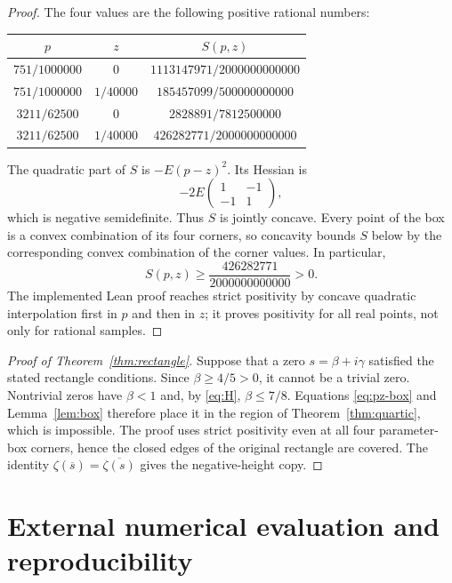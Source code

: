 \documentclass[11pt,a4paper]{article}
\theoremstyle{definition}
\begin{document}
\begin{proof}
The four values are the following positive rational numbers:
\begin{center}
\begin{tabular}{ccc}
\toprule
$p$ & $z$ & $S(p,z)$\\
\midrule
$751/1000000$ & $0$ & $1113147971/2000000000000$\\
$751/1000000$ & $1/40000$ & $185457099/500000000000$\\
$3211/62500$ & $0$ & $2828891/7812500000$\\
$3211/62500$ & $1/40000$ & $426282771/2000000000000$\\
\bottomrule
\end{tabular}
\end{center}
The quadratic part of $S$ is $-E(p-z)^2$. Its Hessian is
\[
 -2E\begin{pmatrix}1&-1\\-1&1\end{pmatrix},
\]
which is negative semidefinite. Thus $S$ is jointly concave.
Every point of the box is a convex combination of its four corners,
so concavity bounds $S$ below by the corresponding convex
combination of the corner values. In particular,
\begin{equation}\label{eq:margin}
 S(p,z)\ge\frac{426282771}{2000000000000}>0.
\end{equation}
The implemented Lean proof reaches strict positivity by concave
quadratic interpolation first in $p$ and then in $z$; it proves
positivity for all real points, not only for rational samples.
\end{proof}

\begin{proof}[Proof of Theorem~\ref{thm:rectangle}]
Suppose that a zero $s=\beta+i\gamma$ satisfied the stated rectangle
conditions. Since $\beta\ge4/5>0$, it cannot be a trivial zero.
Nontrivial zeros have $\beta<1$ and, by \eqref{eq:H},
$\beta\le7/8$. Equations \eqref{eq:pz-box} and
Lemma~\ref{lem:box} therefore place it in the region of
Theorem~\ref{thm:quartic}, which is impossible. The proof uses
strict positivity even at all four parameter-box corners, hence
the closed edges of the original rectangle are covered.
The identity $\zeta(\overline{s})=\overline{\zeta(s)}$ gives the
negative-height copy.
\end{proof}

\section{External numerical evaluation and reproducibility}
\label{sec:numeric}
\end{document}
